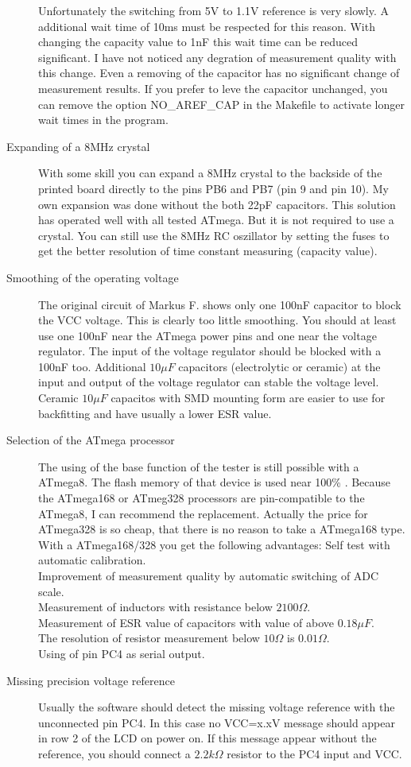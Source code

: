 \begin{description}
Unfortunately the switching from 5V to 1.1V reference is very slowly. A additional
wait time of 10ms must be respected for this reason.
With changing the capacity value to 1nF this wait time can be reduced significant.
I have not noticed any degration of measurement quality with this change.
Even a removing of the capacitor has no significant change of measurement results.
If you prefer to leve the capacitor unchanged, you can remove the option NO\_AREF\_CAP
in the Makefile to activate longer wait times in the program.
\item[Expanding of a 8MHz crystal]
With some skill you can expand a 8MHz crystal to the backside of the printed board
directly to the pins PB6 and PB7 (pin 9 and pin 10).
My own expansion was done without the both 22pF capacitors.
This solution has operated well with all tested ATmega.
But it is not required to use a crystal. You can still use the 8MHz RC oszillator
by setting the fuses to get the better resolution of time constant measuring (capacity value).
\item[Smoothing of the operating voltage]
The original circuit of Markus F. shows only one 100nF capacitor to block the VCC voltage.
This is clearly too little smoothing. You should at least use one 100nF near the ATmega power pins
and one near the voltage regulator. The input of the voltage regulator should be
blocked with a 100nF too.
Additional \(10\mu F\) capacitors (electrolytic or ceramic) at the input and
output of the voltage regulator can stable the voltage level.
Ceramic \(10\mu F\) capacitos with SMD mounting form are easier to use for backfitting
and have usually a lower ESR value. 
\item[Selection of the ATmega processor]
The using of the base function of the tester is still possible with a ATmega8.
The flash memory of that device is used near 100\% .
Because the ATmega168 or ATmeg328 processors are pin-compatible to the ATmega8,
I can recommend the replacement.
Actually the price for ATmega328 is so cheap, that there is no reason to take
a ATmega168 type.
With a ATmega168/328 you get the following advantages:
Self test with automatic calibration.\\
Improvement of measurement quality by automatic switching of ADC scale.\\
Measurement of inductors with resistance  below \(2100 \Omega\).\\
Measurement of ESR value of capacitors with value of above  \(0.18 \mu F\).\\
The resolution of resistor measurement below \(10 \Omega\) is \(0.01 \Omega\).\\
Using of pin PC4 as serial output.\\
\item[Missing precision voltage reference]
Usually the software should detect the missing voltage reference with the unconnected pin PC4.
In this case no VCC=x.xV message should appear in row 2 of the LCD on power on.
If this message appear without the reference, you should connect a \(2.2k \Omega\) resistor
to the PC4 input and VCC.


\end{description}

